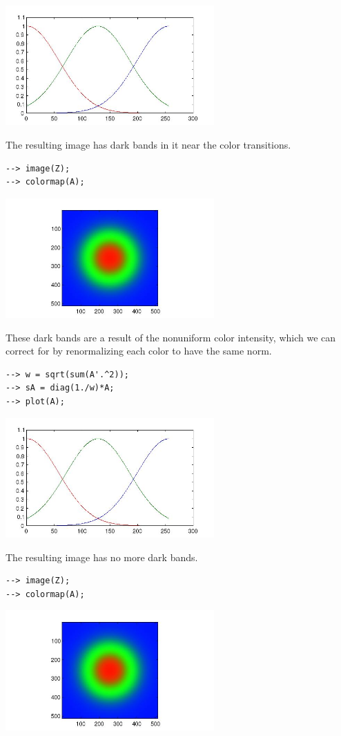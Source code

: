 \centerline{\includegraphics[width=8cm]{colormap4}}


The resulting image has dark bands in it near the color transitions.
\begin{verbatim}
--> image(Z);
--> colormap(A);
\end{verbatim}


\centerline{\includegraphics[width=8cm]{colormap5}}


These dark bands are a result of the nonuniform color intensity, which 
we can correct for by renormalizing each color to have the same norm.
\begin{verbatim}
--> w = sqrt(sum(A'.^2));
--> sA = diag(1./w)*A;
--> plot(A);
\end{verbatim}


\centerline{\includegraphics[width=8cm]{colormap6}}


The resulting image has no more dark bands.
\begin{verbatim}
--> image(Z);
--> colormap(A);
\end{verbatim}


\centerline{\includegraphics[width=8cm]{colormap7}}

